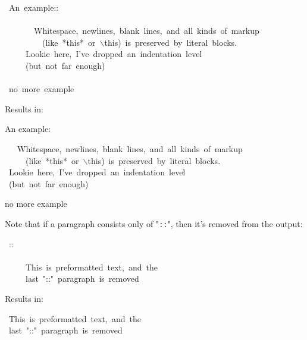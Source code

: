 \documentclass[12pt]{article}
\begin{document}
\begin{ttfamily}\begin{flushleft}
\mbox{~An~example::}\\
\mbox{}\\
\mbox{~~~~~~~Whitespace,~newlines,~blank~lines,~and~all~kinds~of~markup}\\
\mbox{~~~~~~~~~(like~*this*~or~$\backslash$this)~is~preserved~by~literal~blocks.}\\
\mbox{~~~~~Lookie~here,~I've~dropped~an~indentation~level}\\
\mbox{~~~~~(but~not~far~enough)}\\
\mbox{}\\
\mbox{~no~more~example}\\
\end{flushleft}\end{ttfamily}

Results in:

An example:

\begin{ttfamily}\begin{flushleft}
\mbox{~~~Whitespace,~newlines,~blank~lines,~and~all~kinds~of~markup}\\
\mbox{~~~~~(like~*this*~or~$\backslash$this)~is~preserved~by~literal~blocks.}\\
\mbox{~Lookie~here,~I've~dropped~an~indentation~level}\\
\mbox{~(but~not~far~enough)}\\
\end{flushleft}\end{ttfamily}

no more example

\hypertarget{lempty-double-colon}{}

Note that if a paragraph consists only of "\texttt{::}", then it's removed
from the output:

\begin{ttfamily}\begin{flushleft}
\mbox{~::}\\
\mbox{}\\
\mbox{~~~~~This~is~preformatted~text,~and~the}\\
\mbox{~~~~~last~"::"~paragraph~is~removed}\\
\end{flushleft}\end{ttfamily}

Results in:

\begin{ttfamily}\begin{flushleft}
\mbox{~This~is~preformatted~text,~and~the}\\
\mbox{~last~"::"~paragraph~is~removed}\\
\end{flushleft}\end{ttfamily}
\end{document}
